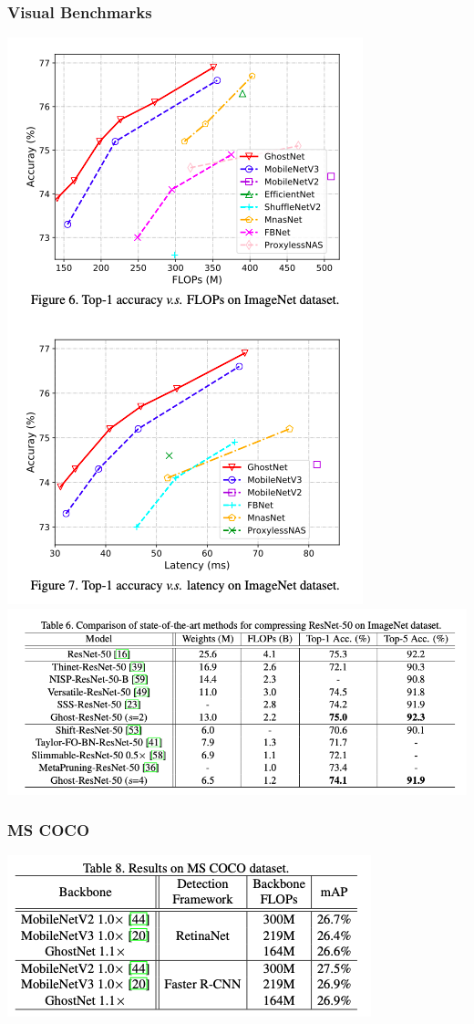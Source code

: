 \documentclass[12pt]{article}
\begin{document}
            \subsubsection{
                Visual Benchmarks
            }
                \begin{center}
                    \includegraphics[scale=0.4]{src/img/acc_and_lat.jpg} \\
                    \includegraphics[scale=0.4]{src/img/Com_imagenet.jpg} \\
                \end{center}
            \subsubsection{
                MS COCO
            }
                \begin{center}
                    \includegraphics[scale=0.6]{src/img/MSCOCO.jpg} \\
                \end{center}                
\end{document}
